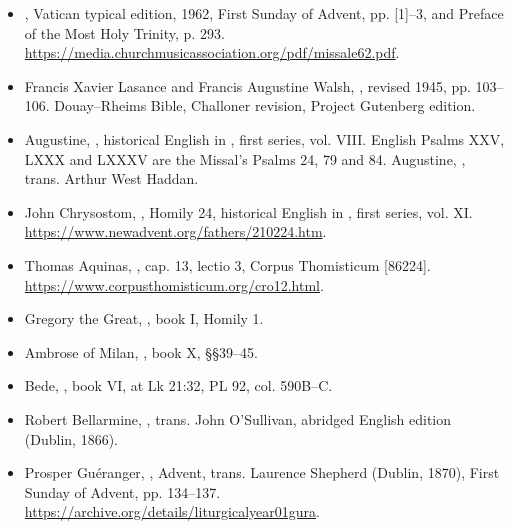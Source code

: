 \begin{itemize}
\item {}, Vatican typical edition, 1962, First Sunday of Advent, pp. [1]--3, and Preface of the Most Holy Trinity, p. 293. \url{https://media.churchmusicassociation.org/pdf/missale62.pdf}.
\item Francis Xavier Lasance and Francis Augustine Walsh, , revised 1945, pp. 103--106. Douay--Rheims Bible, Challoner revision, Project Gutenberg edition.
\item Augustine, , historical English in , first series, vol. VIII. English Psalms XXV, LXXX and LXXXV are the Missal's Psalms 24, 79 and 84. Augustine, , trans. Arthur West Haddan.
\item John Chrysostom, , Homily 24, historical English in , first series, vol. XI. \url{https://www.newadvent.org/fathers/210224.htm}.
\item Thomas Aquinas, , cap. 13, lectio 3, Corpus Thomisticum [86224]. \url{https://www.corpusthomisticum.org/cro12.html}.
\item Gregory the Great, , book I, Homily 1.
\item Ambrose of Milan, , book X, §§39--45.
\item Bede, , book VI, at Lk 21:32, PL 92, col. 590B--C.
\item Robert Bellarmine, , trans. John O'Sullivan, abridged English edition (Dublin, 1866).
\item Prosper Guéranger, , Advent, trans. Laurence Shepherd (Dublin, 1870), First Sunday of Advent, pp. 134--137. \url{https://archive.org/details/liturgicalyear01gura}.
\end{itemize}
